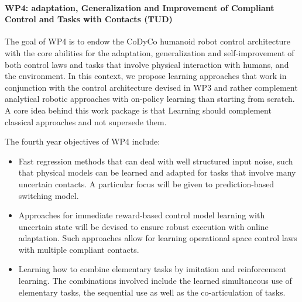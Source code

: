 \paragraph{WP4: adaptation, Generalization and Improvement of Compliant Control and Tasks with Contacts (TUD)}

The goal of WP4 is to endow the CoDyCo humanoid robot control architecture with the core abilities for the
adaptation, generalization and self-improvement of both control laws and tasks that involve physical interaction
with humans, and the environment. In this context, we propose learning approaches that work in conjunction
with the control architecture devised in WP3 and rather complement analytical robotic approaches with on-policy
learning than starting from scratch. A core idea behind this work package is that Learning should complement
classical approaches and not supersede them.

The fourth year objectives of WP4 include:
\begin{itemize}
\item Fast regression methods that can deal with well structured input noise, such that physical models can
be learned and adapted for tasks that involve many uncertain contacts. A particular focus will be given to
prediction-based switching model.
\item Approaches for immediate reward-based control model learning with uncertain state will be devised to ensure
 robust execution with online adaptation. Such approaches allow for learning operational space control laws with
 multiple compliant contacts.
\item Learning how to combine elementary tasks by imitation and reinforcement learning. The combinations involved
include the learned simultaneous use of elementary tasks, the sequential use as well as the co-articulation of
tasks.
\end{itemize}
